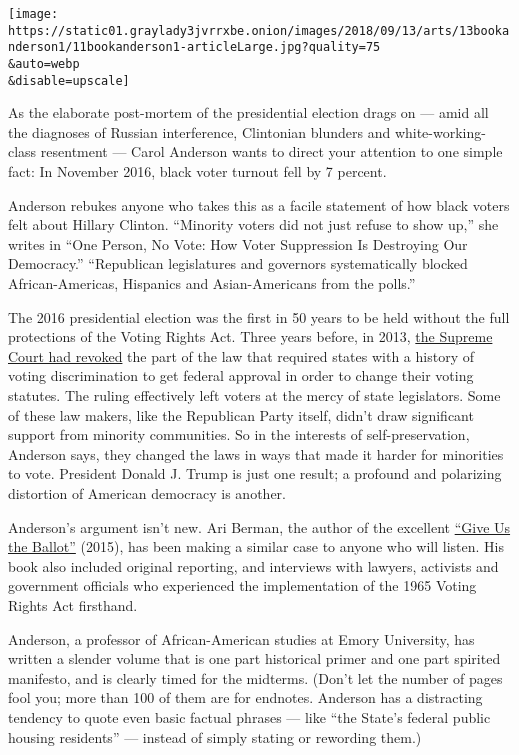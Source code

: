 \texttt{[image: https://static01.graylady3jvrrxbe.onion/images/2018/09/13/arts/13bookanderson1/11bookanderson1-articleLarge.jpg?quality=75\\\&auto=webp\\\&disable=upscale]}

As the elaborate post-mortem of the presidential election drags on ---
amid all the diagnoses of Russian interference, Clintonian blunders and
white-working-class resentment --- Carol Anderson wants to direct your
attention to one simple fact: In November 2016, black voter turnout fell
by 7 percent.

Anderson rebukes anyone who takes this as a facile statement of how
black voters felt about Hillary Clinton. ``Minority voters did not just
refuse to show up,'' she writes in ``One Person, No Vote: How Voter
Suppression Is Destroying Our Democracy.'' ``Republican legislatures and
governors systematically blocked African-Americas, Hispanics and
Asian-Americans from the polls.''

The 2016 presidential election was the first in 50 years to be held
without the full protections of the Voting Rights Act. Three years
before, in 2013,
\href{http://archive.nytimes3xbfgragh.onion/www.nytimes3xbfgragh.onion/interactive/2013/06/25/us/annotated-supreme-court-decision-on-voting-rights-act.html}{the
Supreme Court had revoked} the part of the law that required states with
a history of voting discrimination to get federal approval in order to
change their voting statutes. The ruling effectively left voters at the
mercy of state legislators. Some of these law makers, like the
Republican Party itself, didn't draw significant support from minority
communities. So in the interests of self-preservation, Anderson says,
they changed the laws in ways that made it harder for minorities to
vote. President Donald J. Trump is just one result; a profound and
polarizing distortion of American democracy is another.

Anderson's argument isn't new. Ari Berman, the author of the excellent
\href{http://https//www.nytimes3xbfgragh.onion/2015/08/30/books/review/give-us-the-ballot-by-ari-berman.html}{``Give
Us the Ballot''} (2015), has been making a similar case to anyone who
will listen. His book also included original reporting, and interviews
with lawyers, activists and government officials who experienced the
implementation of the 1965 Voting Rights Act firsthand.

Anderson, a professor of African-American studies at Emory University,
has written a slender volume that is one part historical primer and one
part spirited manifesto, and is clearly timed for the midterms. (Don't
let the number of pages fool you; more than 100 of them are for
endnotes. Anderson has a distracting tendency to quote even basic
factual phrases --- like ``the State's federal public housing
residents'' --- instead of simply stating or rewording them.)

